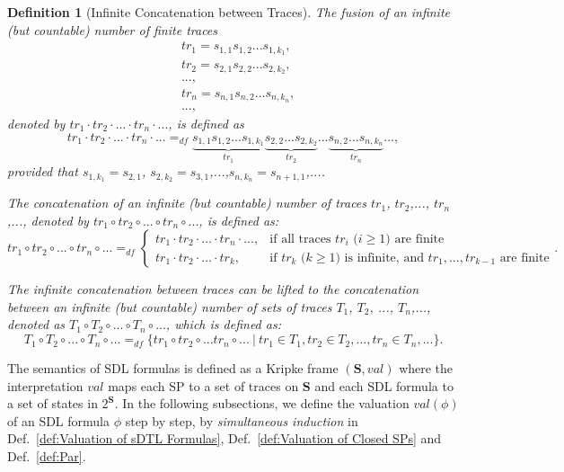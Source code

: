 \documentclass{fcs}
\newtheorem{mydef}{Definition}[section]
\newcommand{\bff}[1]{\mathbf{#1}}
\newcommand{\fus}[0]{\cdot}
\newcommand{\val}[0]{\mathit{val}}
\newcommand{\dddef}[0]{=_{df}}
\begin{document}
\ifx
\begin{mydef}[Infinite Concatenation between Traces]
	The fusion of an infinite (but countable) number of finite traces
	$$\begin{aligned}&tr_1 = s_{1,1}s_{1,2}...s_{1,k_1},\\
					&tr_2 = s_{2,1}s_{2,2}...s_{2,k_2},\\
					&...,\\
					&tr_n = s_{n,1}s_{n,2}...s_{n,k_n},\\
					&...,
	\end{aligned}$$
	denoted by $tr_1\fus tr_2\fus...\fus tr_n\fus...$, is defined as
	$$tr_1\fus tr_2\fus...\fus tr_n\fus...\dddef \underbrace{s_{1,1}s_{1,2}...s_{1,k_1}}_{tr_1}\underbrace{s_{2,2}...s_{2,k_2}}_{tr_2}...\underbrace{s_{n,2}...s_{n,k_n}}_{tr_n}...,$$
	provided that $s_{1,k_1} = s_{2,1}$, $s_{2,k_2} = s_{3,1}$,...,$s_{n,k_n} = s_{n+1,1}$,....
	
	The concatenation of an infinite (but countable) number of traces $tr_1$, $tr_2$,..., $tr_n$,..., denoted by
	$tr_1\circ tr_2\circ ...\circ tr_n\circ ...$, is defined as:
	$$tr_1\circ tr_2\circ ...\circ tr_n\circ...\dddef \left\{
		\begin{array}{ll}
		tr_1\fus tr_2\fus...\fus tr_n \fus ..., &\mbox{if all traces $tr_i$ ($i\ge 1$) are finite}\\
		tr_1\fus tr_2\fus...\fus tr_k,  &\mbox{if $tr_k$ ($k\ge 1$) is infinite, and $tr_1, ..., tr_{k-1}$ are finite}
		\end{array}
	\right..$$
	
	The infinite concatenation between traces can be lifted to the concatenation between an infinite (but countable) number of sets of traces $T_1$, $T_2$, ..., $T_n$,..., denoted as
	$T_1\circ T_2\circ ...\circ T_n\circ ...$, which is defined as:
	$$T_1\circ T_2\circ ...\circ T_n\circ ...\dddef \{tr_1\circ tr_2\circ ...tr_n\circ...\ |\ tr_1\in T_1, tr_2\in T_2,..., tr_n\in T_n, ...\}.$$
\end{mydef}
\fi

The semantics of SDL formulas is defined as a Kripke frame $(\bff{S}, \val)$ where the interpretation $\val$ maps each SP to a set of traces on $\bff{S}$ and each SDL formula to a set of states in $2^\bff{S}$.
In the following subsections, we define the valuation $\val(\phi)$ of an SDL formula $\phi$ step by step, by \emph{simultaneous induction} in Def.~\ref{def:Valuation of sDTL Formulas}, Def.~\ref{def:Valuation of Closed SPs} and Def.~\ref{def:Par}.
\end{document}
